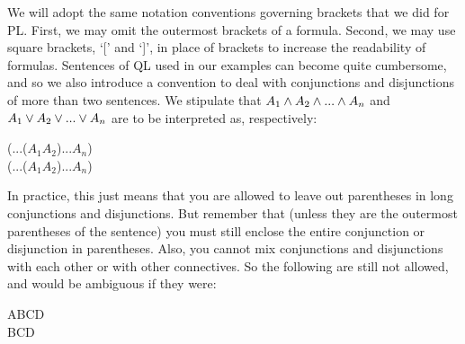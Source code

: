 We will adopt the same notation conventions governing brackets that we did for PL. First, we may omit the outermost brackets of a formula. Second, we may use square brackets, ‘[’ and ‘]’, in place of brackets to increase the readability of formulas. Sentences of QL used in our examples can become quite cumbersome, and so we also introduce a convention to deal with conjunctions and disjunctions of more than two sentences. We stipulate that $A_1\wedge A_2 \wedge ...\wedge A_n$ and $A_1\vee A_2\vee ...\vee A_n$ are to be interpreted as, respectively:
\begin{center}
(...($A_1$\eand $A_2$)\eand ...\eand $A_n$)\\
(...($A_1$\eor $A_2$)\eor ...\eor $A_n$)
\end{center}
In practice, this just means that you are allowed to leave out parentheses in long conjunctions and disjunctions. But remember that (unless they are the outermost parentheses of the sentence) you must still enclose the entire conjunction or disjunction in parentheses. Also, you cannot mix conjunctions and disjunctions with each other or with other connectives. So the following are still not allowed, and would be ambiguous if they were:
\begin{center}
A\eor B\eand C\eand D\\
B\eor C\eif D
\end{center}

